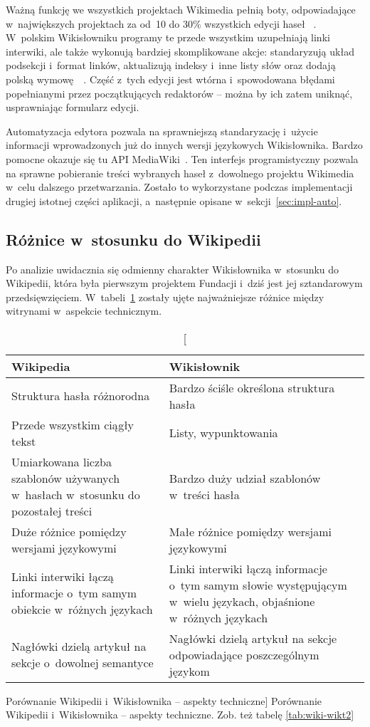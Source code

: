 Ważną funkcję we wszystkich projektach Wikimedia pełnią boty, odpowiadające w~największych projektach za od~10 do 30\% wszystkich edycji haseł ~\cite{bots}. W~polskim Wikisłowniku programy te przede wszystkim uzupełniają linki interwiki, ale także wykonują bardziej skomplikowane akcje: standaryzują układ podsekcji i~format linków, aktualizują indeksy i~inne listy słów oraz dodają polską wymowę~\cite{wikt:boty}~\cite{wikt:olafbot}. Część z~tych edycji jest wtórna i~spowodowana błędami popełnianymi przez początkujących redaktorów -- można by ich zatem uniknąć, usprawniając formularz edycji.

Automatyzacja edytora pozwala na sprawniejszą standaryzację i~użycie informacji wprowadzonych już do innych wersji językowych Wikisłownika. Bardzo pomocne okazuje się tu API MediaWiki~\cite{mw:api}. Ten interfejs programistyczny pozwala na sprawne pobieranie treści wybranych haseł z~dowolnego projektu Wikimedia w~celu dalszego przetwarzania. Zostało to wykorzystane podczas implementacji drugiej istotnej części aplikacji, a~następnie opisane w~sekcji~\ref{sec:impl-auto}.


\subsection{Różnice w~stosunku do Wikipedii}
\label{subs:wiki-wikt}
Po analizie uwidacznia się odmienny charakter Wikisłownika w~stosunku do Wikipedii, która była pierwszym projektem Fundacji i~dziś jest jej sztandarowym przedsięwzięciem. W~tabeli~\ref{tab:wiki-wikt} zostały ujęte najważniejsze różnice między witrynami w~aspekcie technicznym.
\begin{table}[h]
\begin{center}
	\begin{tabularx}{\textwidth}{ XX }
		\toprule \textbf{Wikipedia} & \textbf{Wikisłownik} \\
		\toprule Struktura hasła różnorodna
			& Bardzo ściśle określona struktura hasła \\
		\midrule Przede wszystkim ciągły tekst
			& Listy, wypunktowania \\
		\midrule Umiarkowana liczba szablonów używanych w~hasłach w~stosunku do pozostałej treści
			& Bardzo duży udział szablonów w~treści hasła \\
		\midrule Duże różnice pomiędzy wersjami językowymi
			& Małe różnice pomiędzy wersjami językowymi \\
		\midrule Linki interwiki łączą informacje o~tym samym obiekcie w~różnych językach
			& Linki interwiki łączą informacje o~tym samym słowie występującym w~wielu językach, objaśnione w~różnych językach \\
		\midrule Nagłówki dzielą artykuł na sekcje o~dowolnej semantyce
			& Nagłówki dzielą artykuł na sekcje odpowiadające poszczególnym językom \\
		\bottomrule
	\end{tabularx}
\caption
	[Porównanie Wikipedii i~Wikisłownika -- aspekty techniczne]
	{Porównanie Wikipedii i~Wikisłownika -- aspekty techniczne. Zob. też tabelę \ref{tab:wiki-wikt2}}
\label{tab:wiki-wikt}
\end{center}
\end{table}

